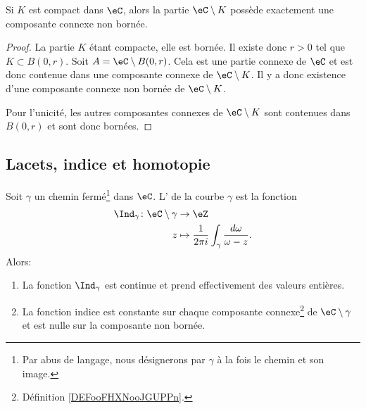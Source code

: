 \begin{lemma}
    Si \( K\) est compact dans \( \eC\), alors la partie \( \eC\setminus K\) possède exactement une composante connexe non bornée.
\end{lemma}

\begin{proof}
    La partie \( K\) étant compacte, elle est bornée. Il existe donc \( r>0\) tel que \( K\subset B(0,r)\). Soit \( A=\eC\setminus B(0,r)\). Cela est une partie connexe de \( \eC\) et est donc contenue dans une composante connexe de \( \eC\setminus K\). Il y a donc existence d'une composante connexe non bornée de \( \eC\setminus K\).

    Pour l'unicité, les autres composantes connexes de \( \eC\setminus K\) sont contenues dans \( B(0,r)\) et sont donc bornées.
\end{proof}

\subsection{Lacets, indice et homotopie}

\begin{propositionDef}      \label{DEFooLFBNooGlvJmp}
	Soit \( \gamma\) un chemin fermé\footnote{Par abus de langage, nous désignerons par \( \gamma\) à la fois le chemin et son image.} dans \( \eC\). L' de la courbe \( \gamma\) est la fonction
	\begin{equation}
		\begin{aligned}
			\Ind_{\gamma}\colon \eC\setminus \gamma & \to \eZ                                                              \\
			z                                       & \mapsto \frac{1}{ 2\pi i }\int_{\gamma}\frac{ d\omega }{ \omega-z }.
		\end{aligned}
	\end{equation}
    Alors:
	\begin{enumerate}
        \item       \label{ITEMooHYHMooWcaJxP}
		      La fonction \( \Ind_{\gamma}\) est continue et prend effectivement des valeurs entières.
		\item
		      La fonction indice est constante sur chaque composante connexe\footnote{Définition \ref{DEFooFHXNooJGUPPn}.} de \( \eC\setminus \gamma\) et est nulle sur la composante non bornée.
	\end{enumerate}
\end{propositionDef}

